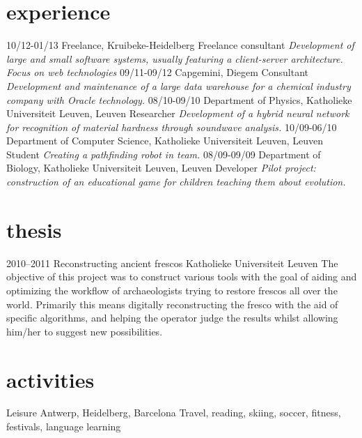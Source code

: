 \documentclass[]{friggeri-cv}
\begin{document}
\section{experience}

\begin{entrylist}
  \entry
    {10/12-01/13}
    {Freelance, Kruibeke-Heidelberg}
    {Freelance consultant}
    {\emph{Development of large and small software systems, usually featuring a client-server architecture. Focus on web technologies}}
  \entry
    {09/11-09/12}
    {Capgemini, Diegem}
    {Consultant}
    {\emph{Development and maintenance of a large data warehouse for a chemical industry company with Oracle technology.}}
  \entry
    {08/10-09/10}
    {Department of Physics, Katholieke Universiteit Leuven, Leuven}
    {Researcher}
    {\emph{Development of a hybrid neural network for recognition of material hardness through soundwave analysis.}}
  \entry
    {10/09-06/10}
    {Department of Computer Science, Katholieke Universiteit Leuven, Leuven}
    {Student}
    {\emph{Creating a pathfinding robot in team.}}
  \entry
    {08/09-09/09}
    {Department of Biology, Katholieke Universiteit Leuven, Leuven}
    {Developer}
    {\emph{Pilot project: construction of an educational game for children teaching them about evolution.}}
\end{entrylist}

\section{thesis}

\begin{entrylist}
  \entry
    {2010--2011}
    {Reconstructing ancient frescos}
    {Katholieke Universiteit Leuven}
    {The objective of this project was to construct various tools with the goal of aiding and optimizing the workflow of archaeologists trying to restore frescos all over the world. Primarily this means digitally reconstructing the fresco with the aid of specific algorithms, and helping the operator judge the results whilst allowing him/her to suggest new possibilities.}
\end{entrylist}

\clearpage

\section{activities}

\begin{entrylist}
  \entry
    {}
    {Leisure}
    {Antwerp, Heidelberg, Barcelona}
    {Travel, reading, skiing, soccer, fitness, festivals, language learning}
\end{entrylist}
\end{document}
